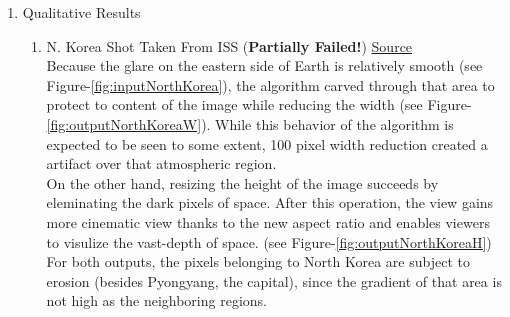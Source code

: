 \documentclass{article}
\begin{document}
\begin{enumerate}
	\item Qualitative Results
	\begin{enumerate}
		\item N. Korea Shot Taken From ISS (\textbf{Partially Failed!})	\href{https://www.nasa.gov/mission_pages/station/research/news/crowdsourcing_night_images}{Source}
		\\ Because the glare on the eastern side of Earth is relatively smooth (see
		Figure-\ref{fig:inputNorthKorea}), the algorithm carved through that area to
		protect to content of the image while reducing the width (see
		Figure-\ref{fig:outputNorthKoreaW}). While this behavior of the algorithm is
		expected to be seen to some extent, 100 pixel width reduction created a
		artifact over that atmospheric region. \\
		On the other hand, resizing the height of the image succeeds by eleminating
		the dark pixels of space. After this operation, the view gains more cinematic
		view thanks to the new aspect ratio and enables viewers to visulize the
		vast-depth of space. (see Figure-\ref{fig:outputNorthKoreaH}) \\
		For both outputs, the pixels belonging to North Korea are subject to erosion
		(besides Pyongyang, the capital), since the gradient of that area is not high
		as the neighboring regions.	\\	

\end{enumerate}
\end{enumerate}
\end{document}
